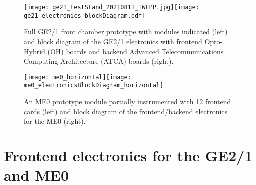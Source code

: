 \documentclass[a4paper,11pt]{article}
\begin{document}

\begin{figure}[!hp]
\centering
\texttt{[image: ge21\_testStand\_20210811\_TWEPP.jpg]}\hspace{0.4cm}\texttt{[image: ge21\_electronics\_blockDiagram.pdf]}\\
\caption{\label{fig:ge21block}Full GE2/1 front chamber prototype with modules indicated (left) and block diagram of the GE2/1 electronics with frontend Opto-Hybrid (OH) boards and backend Advanced Telecommunications Computing Architecture (ATCA) boards (right).}
\end{figure}


\begin{figure}[!hbp]
\centering
\texttt{[image: me0\_horizontal]}\hspace{0.2cm}\texttt{[image: me0\_electronicsBlockDiagram\_horizontal]}
\caption{\label{fig:me0-block}An ME0 prototype module partially instrumented with 12 frontend cards (left) and block diagram of the frontend/backend electronics for the ME0 (right).}
\end{figure}


\section{Frontend electronics for the GE2/1 and ME0}
\end{document}
